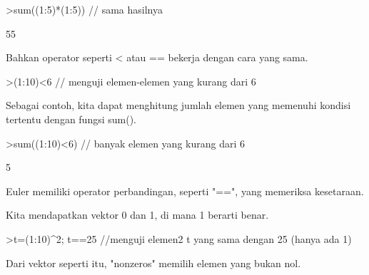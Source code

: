 \documentclass[a4paper,10pt]{article}
\begin{document}
\begin{eulernotebook}
\begin{eulerprompt}
>sum((1:5)*(1:5)) // sama hasilnya
\end{eulerprompt}
\begin{euleroutput}
  55
\end{euleroutput}
\begin{eulercomment}
Bahkan operator seperti \textless{} atau == bekerja dengan cara yang sama.
\end{eulercomment}
\begin{eulerprompt}
>(1:10)<6 // menguji elemen-elemen yang kurang dari 6
\end{eulerprompt}
\begin{euleroutput}
  [1,  1,  1,  1,  1,  0,  0,  0,  0,  0]
\end{euleroutput}
\begin{eulercomment}
Sebagai contoh, kita dapat menghitung jumlah elemen yang memenuhi
kondisi tertentu dengan fungsi sum().
\end{eulercomment}
\begin{eulerprompt}
>sum((1:10)<6) // banyak elemen yang kurang dari 6
\end{eulerprompt}
\begin{euleroutput}
  5
\end{euleroutput}
\begin{eulercomment}
Euler memiliki operator perbandingan, seperti "==", yang memeriksa
kesetaraan.

Kita mendapatkan vektor 0 dan 1, di mana 1 berarti benar.
\end{eulercomment}
\begin{eulerprompt}
>t=(1:10)^2; t==25 //menguji elemen2 t yang sama dengan 25 (hanya ada 1)
\end{eulerprompt}
\begin{euleroutput}
  [0,  0,  0,  0,  1,  0,  0,  0,  0,  0]
\end{euleroutput}
\begin{eulercomment}
Dari vektor seperti itu, "nonzeros" memilih elemen yang bukan nol.


\end{eulercomment}
\end{eulernotebook}
\end{document}

